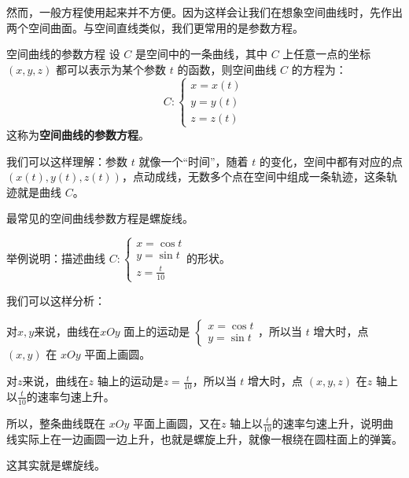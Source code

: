 然而，一般方程使用起来并不方便。因为这样会让我们在想象空间曲线时，先作出两个空间曲面。与空间直线类似，我们更常用的是参数方程。

\begin{definition}{空间曲线的参数方程}{}
设 $C$ 是空间中的一条曲线，其中 $C$ 上任意一点的坐标 $(x,y,z)$ 都可以表示为某个参数 $t$ 的函数，则空间曲线 $C$ 的方程为：
\[
C: \begin{cases}
x = x(t) \\
y = y(t) \\
z = z(t)
\end{cases}
\]
这称为\textbf{空间曲线的参数方程}。
\end{definition}

我们可以这样理解：参数 $t$ 就像一个“时间”，随着 $t$ 的变化，空间中都有对应的点 $(x(t), y(t), z(t))$，点动成线，无数多个点在空间中组成一条轨迹，这条轨迹就是曲线 $C$。

最常见的空间曲线参数方程是螺旋线。

\begin{myexample}
  举例说明：描述曲线
  \(C :
  \begin{cases}
    x = \cos t \\
    y = \sin t \\
    z = \frac{t}{10}
  \end{cases}
  \)的形状。

我们可以这样分析：

对$x,y$来说，曲线在$xOy$ 面上的运动是
\(
  \begin{cases}
    x = \cos t \\
    y = \sin t
  \end{cases}
  \)，所以当 $t$ 增大时，点 $(x,y)$ 在 $xOy$ 平面上画圆。

对$z$来说，曲线在$z$ 轴上的运动是\(z = \frac{t}{10}\)，所以当 $t$ 增大时，点 $(x,y,z)$ 在$z$ 轴上以\(\frac{t}{10}\)的速率匀速上升。

所以，整条曲线既在 $xOy$ 平面上画圆，又在$z$ 轴上以\(\frac{t}{10}\)的速率匀速上升，说明曲线实际上在一边画圆一边上升，也就是螺旋上升，就像一根绕在圆柱面上的弹簧。

这其实就是螺旋线。

  \begin{center}
  \end{center}

\end{myexample}

